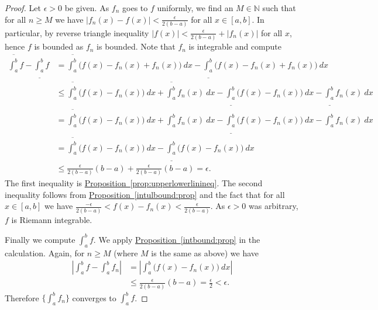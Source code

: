 \documentclass[12pt]{book}
\newcommand{\abs}[1]{\left\lvert {#1} \right\rvert}
\newcommand{\N}{{\mathbb{N}}}
\theoremstyle{plain}
\theoremstyle{remark}
\theoremstyle{definition}
\theoremstyle{exercise}
\theoremstyle{example}
\newcommand{\propref}[1]{\hyperref[#1]{Proposition~\ref*{#1}}}
\begin{document}
\begin{proof}
Let $\epsilon > 0$ be given.
As $f_n$ goes to $f$ uniformly, we find an $M \in \N$ such that
for all $n \geq M$ we have 
$\abs{f_n(x)-f(x)} < \frac{\epsilon}{2(b-a)}$ for all $x \in [a,b]$.
In particular, by reverse triangle inequality
$\abs{f(x)} < \frac{\epsilon}{2(b-a)} + \abs{f_n(x)}$ for all $x$,
hence $f$ is bounded
as $f_n$ is bounded.
Note that $f_n$ is integrable and compute
\begin{equation*}
\begin{split}
\overline{\int_a^b} f
-
\underline{\int_a^b} f
& =
\overline{\int_a^b} \bigl( f(x) - f_n(x) + f_n(x) \bigr)~dx
-
\underline{\int_a^b} \bigl( f(x) - f_n(x) + f_n(x) \bigr)~dx
\\
& \leq
\overline{\int_a^b} \bigl( f(x) - f_n(x) \bigr)~dx +  \overline{\int_a^b} f_n(x) ~dx
-
\underline{\int_a^b} \bigl( f(x) - f_n(x) \bigr)~dx -  \underline{\int_a^b} f_n(x) ~dx
\\
& =
\overline{\int_a^b} \bigl( f(x) - f_n(x) \bigr)~dx +  \int_a^b f_n(x) ~dx
-
\underline{\int_a^b} \bigl( f(x) - f_n(x) \bigr)~dx -  \int_a^b f_n(x) ~dx
\\
& =
\overline{\int_a^b} \bigl( f(x) - f_n(x) \bigr)~dx
-
\underline{\int_a^b} \bigl( f(x) - f_n(x) \bigr)~dx
\\
& \leq
\frac{\epsilon}{2(b-a)} (b-a) + 
\frac{\epsilon}{2(b-a)} (b-a) = \epsilon .
\end{split}
\end{equation*}
The first inequality is \propref{prop:upperlowerlinineq}.
The second inequality follows from \propref{intulbound:prop} and 
the fact that for all $x \in [a,b]$ we have
$\frac{-\epsilon}{2(b-a)} < f(x)-f_n(x) < \frac{\epsilon}{2(b-a)}$.
As $\epsilon > 0$ was arbitrary, $f$ is Riemann integrable.

Finally we compute $\int_a^b f$.  We apply \propref{intbound:prop}
in the calculation.  Again, for $n \geq M$ (where $M$ is the same as above) we have
\begin{equation*}
\begin{split}
\abs{\int_a^b f - \int_a^b f_n} & = 
\abs{ \int_a^b \bigl(f(x) - f_n(x)\bigr)~dx}
\\
& \leq
\frac{\epsilon}{2(b-a)} (b-a) = \frac{\epsilon}{2} < \epsilon .
\end{split}
\end{equation*}
Therefore $\{ \int_a^b f_n \}$ converges to $\int_a^b f$.
\end{proof}
\end{document}
